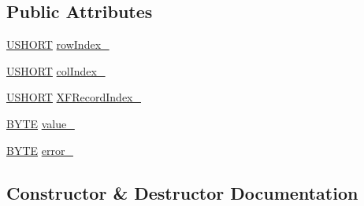 \subsection*{Public Attributes}
\begin{DoxyCompactItemize}
\item 
\hyperlink{_basic_excel_8hpp_a5850d5316caf7f4cedd742fdf8cd7c02}{U\+S\+H\+O\+R\+T} \hyperlink{struct_y_excel_1_1_worksheet_1_1_cell_table_1_1_row_block_1_1_cell_block_1_1_bool_err_a5ae3ae54c1d015a79e237cb13285d0af}{row\+Index\+\_\+}
\item 
\hyperlink{_basic_excel_8hpp_a5850d5316caf7f4cedd742fdf8cd7c02}{U\+S\+H\+O\+R\+T} \hyperlink{struct_y_excel_1_1_worksheet_1_1_cell_table_1_1_row_block_1_1_cell_block_1_1_bool_err_acb7e2537d9c8a5882c980c13530eeca2}{col\+Index\+\_\+}
\item 
\hyperlink{_basic_excel_8hpp_a5850d5316caf7f4cedd742fdf8cd7c02}{U\+S\+H\+O\+R\+T} \hyperlink{struct_y_excel_1_1_worksheet_1_1_cell_table_1_1_row_block_1_1_cell_block_1_1_bool_err_adf216fa699c3f9d3416416f879209d52}{X\+F\+Record\+Index\+\_\+}
\item 
\hyperlink{_basic_excel_8hpp_a4ae1dab0fb4b072a66584546209e7d58}{B\+Y\+T\+E} \hyperlink{struct_y_excel_1_1_worksheet_1_1_cell_table_1_1_row_block_1_1_cell_block_1_1_bool_err_a04a0eaeb16a7e193ce0d02de24659b11}{value\+\_\+}
\item 
\hyperlink{_basic_excel_8hpp_a4ae1dab0fb4b072a66584546209e7d58}{B\+Y\+T\+E} \hyperlink{struct_y_excel_1_1_worksheet_1_1_cell_table_1_1_row_block_1_1_cell_block_1_1_bool_err_a2474185e5b0030f12e750212fc0532df}{error\+\_\+}
\end{DoxyCompactItemize}


\subsection{Constructor \& Destructor Documentation}
\hypertarget{struct_y_excel_1_1_worksheet_1_1_cell_table_1_1_row_block_1_1_cell_block_1_1_bool_err_accecb5cb0f37e4736930d8e29f78a5eb}{}
